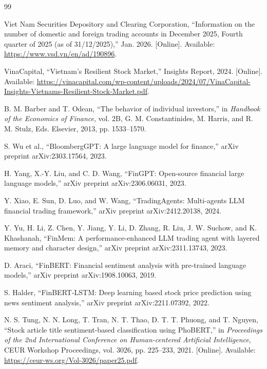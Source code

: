 \documentclass[12pt,a4paper,oneside]{report}
\begin{document}


\renewcommand{\bibname}{References}
\begin{thebibliography}{99}
\addcontentsline{toc}{chapter}{\bibname}
Viet Nam Securities Depository and Clearing Corporation, ``Information on the number of domestic and foreign trading accounts in December 2025, Fourth quarter of 2025 (as of 31/12/2025),'' Jan. 2026. [Online]. Available: \url{https://www.vsd.vn/en/ad/190896}.

VinaCapital, ``Vietnam's Resilient Stock Market,'' Insights Report, 2024. [Online]. Available: \url{https://vinacapital.com/wp-content/uploads/2024/07/VinaCapital-Insights-Vietnams-Resilient-Stock-Market.pdf}.

B. M. Barber and T. Odean, ``The behavior of individual investors,'' in \textit{Handbook of the Economics of Finance}, vol. 2B, G. M. Constantinides, M. Harris, and R. M. Stulz, Eds. Elsevier, 2013, pp. 1533--1570.

S. Wu et al., ``BloombergGPT: A large language model for finance,'' arXiv preprint arXiv:2303.17564, 2023.

H. Yang, X.-Y. Liu, and C. D. Wang, ``FinGPT: Open-source financial large language models,'' arXiv preprint arXiv:2306.06031, 2023.

Y. Xiao, E. Sun, D. Luo, and W. Wang, ``TradingAgents: Multi-agents LLM financial trading framework,'' arXiv preprint arXiv:2412.20138, 2024.

Y. Yu, H. Li, Z. Chen, Y. Jiang, Y. Li, D. Zhang, R. Liu, J. W. Suchow, and K. Khashanah, ``FinMem: A performance-enhanced LLM trading agent with layered memory and character design,'' arXiv preprint arXiv:2311.13743, 2023.

D. Araci, ``FinBERT: Financial sentiment analysis with pre-trained language models,'' arXiv preprint arXiv:1908.10063, 2019.

S. Halder, ``FinBERT-LSTM: Deep learning based stock price prediction using news sentiment analysis,'' arXiv preprint arXiv:2211.07392, 2022.

N. S. Tung, N. N. Long, T. Tran, N. T. Thao, D. T. T. Phuong, and T. Nguyen, ``Stock article title sentiment-based classification using PhoBERT,'' in \textit{Proceedings of the 2nd International Conference on Human-centered Artificial Intelligence}, CEUR Workshop Proceedings, vol. 3026, pp. 225--233, 2021. [Online]. Available: \url{https://ceur-ws.org/Vol-3026/paper25.pdf}.


\end{thebibliography}
\end{document}
